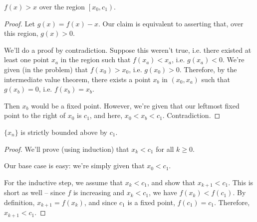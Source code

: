 \begin{lemma}
\label{l:fp-iter-region}
$f(x) > x$ over the region $\left[x_0, c_1\right)$. 
\end{lemma}
\begin{proof}
Let $g(x) = f(x) - x$. Our claim is equivalent to asserting that, over this region, $g(x) > 0$. 

We'll do a proof by contradiction. Suppose this weren't true, i.e. there existed at least one point $x_a$ in the region such that $f(x_a) < x_a$, i.e. $g(x_a) < 0$. We're given (in the problem) that $f(x_0) > x_0$, i.e. $g(x_0) > 0$. Therefore, by the intermediate value theorem, there exists a point $x_b$ in $(x_0, x_a)$ such that $g(x_b) = 0$, i.e. $f(x_b) = x_b$. 

Then $x_b$ would be a fixed point. However, we're given that our leftmost fixed point to the right of $x_0$ is $c_1$, and here, $x_0 < x_b < c_1$. Contradiction.
\end{proof}



\begin{lemma}
\label{l:fp-iter-bound}
$\{x_n\}$ is strictly bounded above by $c_1$.
\end{lemma}
\begin{proof}
We'll prove (using induction) that $x_k < c_1$ for all $k \geq 0$. 

Our base case is easy: we're simply given that $x_0 < c_1$.

For the inductive step, we assume that $x_k < c_1$, and show that $x_{k+1} < c_1$. This is short as well -- since $f$ is increasing and $x_k < c_1$, we have $f(x_k) < f(c_1)$. By definition, $x_{k+1} = f(x_k)$, and since $c_1$ is a fixed point, $f(c_1) = c_1$. Therefore, $x_{k+1} < c_1$. 
\end{proof}



